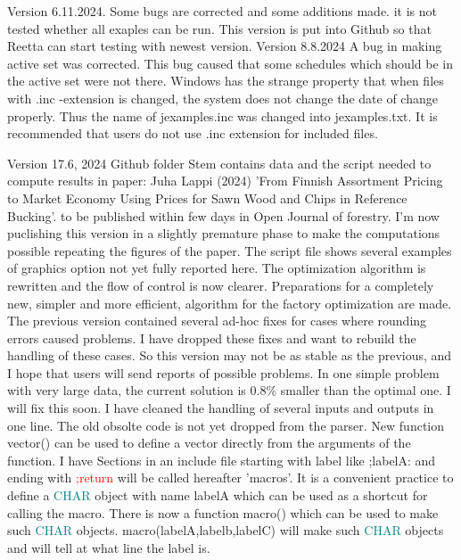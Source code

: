 Version 6.11.2024. Some bugs are corrected and some additions made. it is not tested whether all exaples can be run. 
This version is put into Github so that Reetta can start testing with newest version. 
Version 8.8.2024 A bug in making active set was corrected. This bug caused that some schedules which should be 
in the active set were not there. Windows has the strange property that when files with .inc -extension 
is changed, the system does not change the date of change properly. Thus the name of jexamples.inc was changed 
into jexamples.txt. It is recommended that users do not use .inc extension for included files. 
 
Version 17.6, 2024 Github folder Stem contains data and the script needed to compute results in paper: Juha Lappi (2024) 'From Finnish Assortment Pricing to Market 
Economy Using Prices for Sawn Wood and 
Chips in Reference Bucking'.  to be  published within few days in Open Journal of forestry. 
I'm now puclishing this version in a slightly premature phase to make the computations possible repeating the figures 
of the paper. 
The script file shows several 
examples of graphics option not yet fully reported here. The optimization algorithm is 
rewritten and the flow of control is now clearer. Preparations for a completely new, simpler and more efficient, algorithm for the factory optimization are made. 
The previous version contained several ad-hoc fixes for cases where rounding errors caused problems. 
I have dropped these fixes and want to rebuild the handling of these cases. So this version may not be 
as stable as the previous, and I hope that users will send reports of possible problems. In one simple problem with 
very large data, the current solution is 0.8\% smaller than the optimal one. I will fix this soon. 
I have cleaned the handling of several inputs and outputs in one line. The old obsolte code is not yet dropped 
from the parser. New function \textcolor{VioletRed}{vector}() can be used to define a vector directly from the arguments of the function. 
I have  Sections in an include file starting with label like ;labelA: and 
ending with \textcolor{Red}{;return} will be called hereafter 'macros'. It is a convenient practice to 
define a \textcolor{teal}{CHAR} object with name labelA which can be used as a shortcut for calling the macro. 
There is now a function \textcolor{VioletRed}{macro}() which can be used to make such \textcolor{teal}{CHAR} objects. 
\textcolor{VioletRed}{macro}(labelA,labelb,labelC) will make such \textcolor{teal}{CHAR} objects and will tell at what line the label is. 
